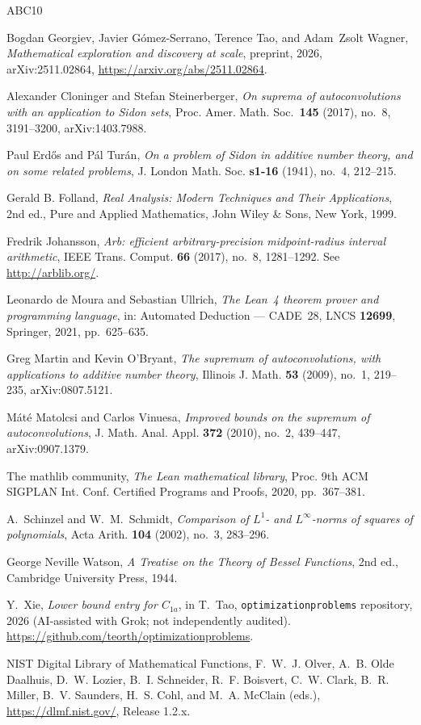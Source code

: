 \documentclass[11pt, letterpaper]{article}
\theoremstyle{paperplain}
\theoremstyle{paperdef}
\begin{document}
\begin{thebibliography}{ABC10}

Bogdan Georgiev, Javier G\'omez-Serrano, Terence Tao, and Adam~Zsolt
Wagner, \emph{Mathematical exploration and discovery at scale},
preprint, 2026, arXiv:2511.02864,
\url{https://arxiv.org/abs/2511.02864}.

Alexander Cloninger and Stefan Steinerberger, \emph{On suprema of
autoconvolutions with an application to Sidon sets}, Proc. Amer. Math.
Soc.\ \textbf{145} (2017), no.~8, 3191--3200, arXiv:1403.7988.

Paul Erd\H{o}s and P\'al Tur\'an, \emph{On a problem of Sidon in additive
number theory, and on some related problems}, J. London Math. Soc.
\textbf{s1-16} (1941), no.~4, 212--215.

Gerald B. Folland, \emph{Real Analysis: Modern Techniques and Their
Applications}, 2nd ed., Pure and Applied Mathematics, John Wiley \& Sons,
New York, 1999.

Fredrik Johansson, \emph{Arb: efficient arbitrary-precision midpoint-radius
interval arithmetic}, IEEE Trans. Comput. \textbf{66} (2017), no.~8,
1281--1292.  See \url{http://arblib.org/}.

Leonardo de Moura and Sebastian Ullrich, \emph{The Lean~4 theorem prover
and programming language}, in: Automated Deduction --- CADE~28, LNCS
\textbf{12699}, Springer, 2021, pp.~625--635.

Greg Martin and Kevin O'Bryant, \emph{The supremum of autoconvolutions,
with applications to additive number theory}, Illinois J. Math.
\textbf{53} (2009), no.~1, 219--235, arXiv:0807.5121.

M\'at\'e Matolcsi and Carlos Vinuesa, \emph{Improved bounds on the supremum
of autoconvolutions}, J. Math. Anal. Appl. \textbf{372} (2010), no.~2,
439--447, arXiv:0907.1379.

The mathlib community, \emph{The Lean mathematical library}, Proc.
9th ACM SIGPLAN Int. Conf. Certified Programs and Proofs, 2020,
pp.~367--381.

A.~Schinzel and W.~M.~Schmidt,
\emph{Comparison of $L^{1}$- and $L^{\infty}$-norms of squares of polynomials},
Acta Arith. \textbf{104} (2002), no.~3, 283--296.

George Neville Watson, \emph{A Treatise on the Theory of Bessel
Functions}, 2nd ed., Cambridge University Press, 1944.

Y.~Xie, \emph{Lower bound entry for $C_{1a}$}, in T.~Tao,
\texttt{optimizationproblems} repository, 2026 (AI-assisted with Grok;
not independently audited).
\url{https://github.com/teorth/optimizationproblems}.

NIST Digital Library of Mathematical Functions,
F.~W.~J. Olver, A.~B. Olde Daalhuis, D.~W. Lozier, B.~I. Schneider,
R.~F. Boisvert, C.~W. Clark, B.~R. Miller, B.~V. Saunders, H.~S. Cohl,
and M.~A. McClain (eds.), \url{https://dlmf.nist.gov/}, Release 1.2.x.

\end{thebibliography}
\end{document}
